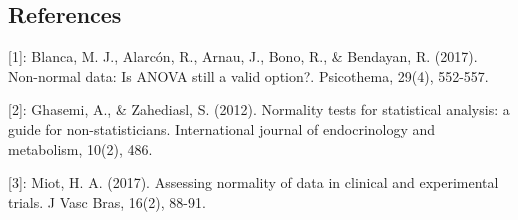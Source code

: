 \documentclass[]{article}
\begin{document}
\hypertarget{references}{%
\subsection{References}\label{references}}

{[}1{]}: Blanca, M. J., Alarcón, R., Arnau, J., Bono, R., \& Bendayan,
R. (2017). Non-normal data: Is ANOVA still a valid option?. Psicothema,
29(4), 552-557.

{[}2{]}: Ghasemi, A., \& Zahediasl, S. (2012). Normality tests for
statistical analysis: a guide for non-statisticians. International
journal of endocrinology and metabolism, 10(2), 486.

{[}3{]}: Miot, H. A. (2017). Assessing normality of data in clinical and
experimental trials. J Vasc Bras, 16(2), 88-91.
\end{document}
